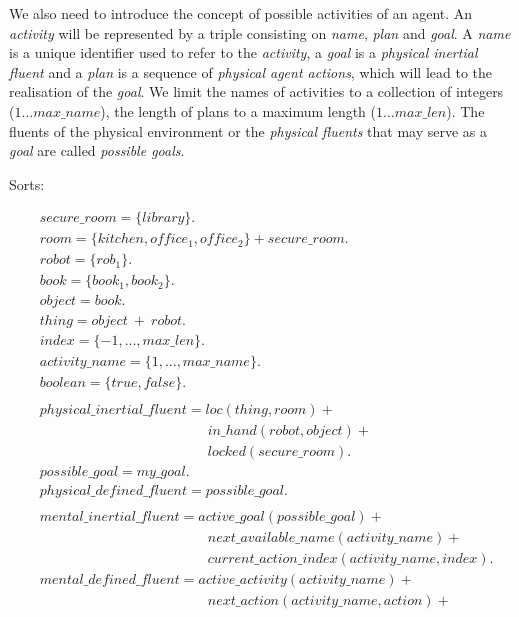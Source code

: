 \documentclass[11pt, oneside]{article}
\begin{document}
We also need to introduce the concept of possible activities of an agent. An \emph{activity} will be represented by a triple consisting on \emph{name}, \emph{plan} and \emph{goal}. A \emph{name} is a unique identifier used to refer to the \emph{activity}, a \emph{goal} is a \emph{physical inertial  fluent} and a \emph{plan} is a sequence of \emph{physical agent  actions}, which will lead to the realisation of the \emph{goal}.  We limit the names of activities to a collection of integers ($1\dots max\_name$), the length of plans to a maximum length ($1\dots max\_len$). The fluents of the physical environment  or the \emph{physical fluents} that may serve as a \emph{goal} are called \emph{possible  goals}. 


Sorts:
\begin{allowdisplaybreaks}
\begin{align*}
  &secure\_room = \{library\}.\\
  &room = \{kitchen, office_1, office_2\} + secure\_room.\\
  &robot = \{rob_1\}.\\
  &book = \{book_1, book_2\}.\\
  &object = book.\\
  &thing = object\ +\ robot.\\
  &index = \{-1,\dots ,max\_len\}.\\
  &activity\_name = \{1, \dots, max\_name\}.\\
  &boolean = \{true, false\}.\\
  \\
  &physical\_inertial\_fluent =  loc(thing, room) +\\
  &\qquad\qquad\qquad\qquad\qquad\qquad in\_hand(robot,object) +\\
  &\qquad\qquad\qquad\qquad\qquad\qquad locked(secure\_room). \\
  &possible\_goal = my\_goal.\\
  &physical\_defined\_fluent = possible\_goal.\\
  \\
  &mental\_inertial\_fluent =  active\_goal(possible\_goal) +\\
&\qquad\qquad\qquad\qquad\qquad\qquad next\_available\_name(activity\_name) +\\
&\qquad\qquad\qquad\qquad\qquad\qquad current\_action\_index(activity\_name, index).\\
&mental\_defined\_fluent = active\_activity(activity\_name)+\\
&\qquad\qquad\qquad\qquad\qquad\qquad next\_action(activity\_name, action)+\\

\end{align*}
\end{allowdisplaybreaks}
\end{document}
